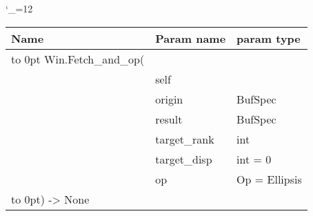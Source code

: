 \begingroup \catcode`\_=12 \tt
\begin{tabular}{lll}
\toprule
\textrm{Name}&\textrm{Param name}&\textrm{param type}\\
\midrule
\hbox to 0pt {Win.Fetch_and_op(\hss}\\
& self\\
& origin & BufSpec\\
& result & BufSpec\\
& target_rank & int\\
& target_disp & int = 0\\
& op & Op = Ellipsis\\
\hbox to 0pt{) -> None\hss}\\
\bottomrule
\end{tabular}
\endgroup
